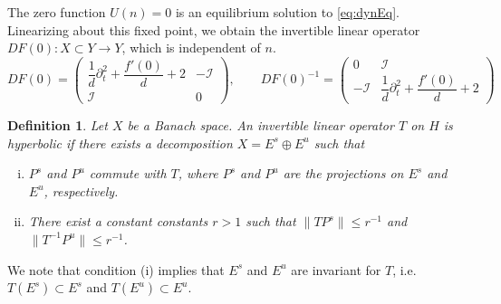 \documentclass[12pt,reqno]{amsart}
\def\id{{\mathcal I}}
\newtheorem{definition}{Definition}
\begin{document}
The zero function $U(n) = 0$ is an equilibrium solution to \cref{eq:dynEq}. Linearizing about this fixed point, we obtain the invertible linear operator $DF(0): X \subset Y \rightarrow Y$, which is independent of $n$.
\begin{equation}\label{eq:DF0}
DF(0) = \begin{pmatrix}
\dfrac{1}{d}\partial_t^2 + \dfrac{f'(0)}{d} + 2 & -\id \\ \id & 0
\end{pmatrix}, \qquad
DF(0)^{-1} = \begin{pmatrix}
0 & \id \\ -\id & \dfrac{1}{d}\partial_t^2 + \dfrac{f'(0)}{d} + 2
\end{pmatrix}
\end{equation}

\begin{definition}\label{def:hyp}
Let $X$ be a Banach space. An invertible linear operator $T$ on $H$ is hyperbolic if there exists a decomposition $X = E^s \oplus E^u$ such that 
\begin{enumerate}[(i)]
\item $P^s$ and $P^u$ commute with $T$, where $P^s$ and $P^u$ are the projections on $E^s$ and $E^u$, respectively.
\item There exist a constant constants $r > 1$ such that $\| T P^s \| \leq r^{-1}$ and $\| T^{-1} P^u \| \leq r^{-1}$.
\end{enumerate}
\end{definition}

We note that condition (i) implies that $E^s$ and $E^u$ are invariant for $T$, i.e. $T(E^s) \subset E^s$ and $T(E^u) \subset E^u$.
\end{document}
